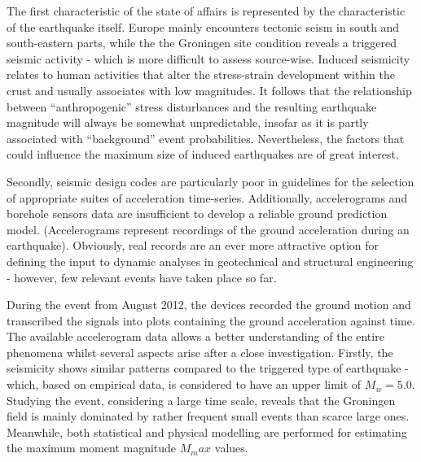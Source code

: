 \documentclass[11pt,a4paper]{report}
\begin{document}
The first characteristic of the state of affairs is represented by the characteristic of the earthquake itself. Europe mainly encounters tectonic seism in south and south-eastern parts, while the the Groningen site condition reveals a triggered seismic activity - which is more difficult to assess source-wise. Induced seismicity relates to human activities that alter the stress-strain development within the crust and usually associates with low magnitudes. It follows that the relationship between “anthropogenic” stress disturbances and the resulting earthquake magnitude will always be somewhat unpredictable, insofar as it is partly associated with “background” event probabilities. Nevertheless, the factors that could influence the maximum size of induced earthquakes are of great interest. 

Secondly, seismic design codes are particularly poor in guidelines for the selection of appropriate suites of acceleration time-series. Additionally, accelerograms and borehole sensors data are insufficient to develop a reliable ground prediction model. (Accelerograms represent recordings of the ground acceleration during an earthquake). Obviously, real records are an ever more attractive option for defining the input to dynamic analyses in geotechnical and structural engineering - however, few relevant events have taken place so far. 

During the event from August 2012, the devices recorded the ground motion and transcribed the signals into plots containing the ground acceleration against time. The available accelerogram data allows a better understanding of the entire phenomena whilst several aspects arise after a close investigation. Firstly, the seismicity shows similar patterns compared to the triggered type of earthquake - which, based on empirical data, is considered to have an upper limit of $M_w=5.0$. Studying the event, considering a large time scale, reveals that the Groningen field is mainly dominated by rather frequent small events than scarce large ones. Meanwhile, both statistical and physical modelling are performed for estimating the maximum moment magnitude $M_max$ values.
\end{document}
